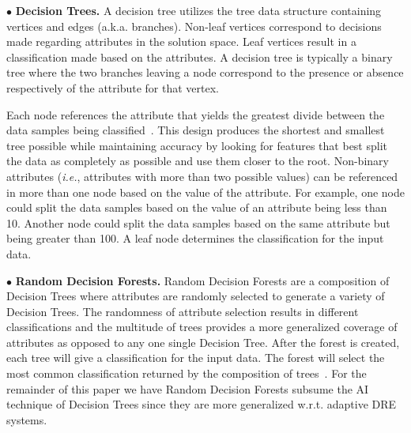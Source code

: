 \documentclass[conference]{IEEEtran}
\begin{document}
$\bullet$ {\bf Decision Trees.} A decision tree utilizes the tree data structure containing vertices and edges (a.k.a. branches). Non-leaf vertices correspond to decisions made regarding attributes in the solution space. Leaf vertices result in a classification made based on the attributes. A decision tree is typically a binary tree where the two branches leaving a node correspond to the presence or absence respectively of the attribute for that vertex.

Each node references the attribute that yields the greatest divide between the data samples being classified~\cite{Russell:10}. This design produces the shortest and smallest tree
possible while maintaining accuracy by looking for features that
best split the data as completely as possible and use them closer to the root.
Non-binary attributes (\emph{i.e.}, attributes with more than two possible values) can be referenced in more than one node based on the value of the attribute. For example, one node could split the data samples based on the value of an attribute being less than 10. Another node could split the data samples based on the same attribute but being greater than 100. A leaf node determines the classification for the input data.



$\bullet$ {\bf Random Decision Forests.}
Random Decision Forests are a composition of Decision Trees where attributes are randomly selected to generate a variety of Decision Trees. The randomness of attribute selection results in different classifications and the multitude of trees provides a more generalized coverage of attributes as opposed to any one single Decision Tree.
After the forest is created, each tree will give a classification for the input data. The forest will select the most common classification returned by the composition of trees~\cite{Lin:06}.  For the remainder of this paper we have Random Decision Forests subsume the AI technique of Decision Trees since they are more generalized w.r.t. adaptive DRE systems.
\end{document}
